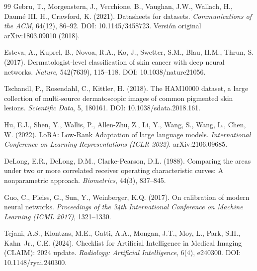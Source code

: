 \begin{thebibliography}{99}
Gebru, T., Morgenstern, J., Vecchione, B., Vaughan, J.W., Wallach, H., Daumé III, H., Crawford, K. (2021). Datasheets for datasets. \emph{Communications of the ACM}, 64(12), 86--92. DOI: 10.1145/3458723. Versión original arXiv:1803.09010 (2018).

Esteva, A., Kuprel, B., Novoa, R.A., Ko, J., Swetter, S.M., Blau, H.M., Thrun, S. (2017). Dermatologist-level classification of skin cancer with deep neural networks. \emph{Nature}, 542(7639), 115--118. DOI: 10.1038/nature21056.

Tschandl, P., Rosendahl, C., Kittler, H. (2018). The HAM10000 dataset, a large collection of multi-source dermatoscopic images of common pigmented skin lesions. \emph{Scientific Data}, 5, 180161. DOI: 10.1038/sdata.2018.161.

Hu, E.J., Shen, Y., Wallis, P., Allen-Zhu, Z., Li, Y., Wang, S., Wang, L., Chen, W. (2022). LoRA: Low-Rank Adaptation of large language models. \emph{International Conference on Learning Representations (ICLR 2022)}. arXiv:2106.09685.

DeLong, E.R., DeLong, D.M., Clarke-Pearson, D.L. (1988). Comparing the areas under two or more correlated receiver operating characteristic curves: A nonparametric approach. \emph{Biometrics}, 44(3), 837--845.

Guo, C., Pleiss, G., Sun, Y., Weinberger, K.Q. (2017). On calibration of modern neural networks. \emph{Proceedings of the 34th International Conference on Machine Learning (ICML 2017)}, 1321--1330.

Tejani, A.S., Klontzas, M.E., Gatti, A.A., Mongan, J.T., Moy, L., Park, S.H., Kahn~Jr., C.E. (2024). Checklist for Artificial Intelligence in Medical Imaging (CLAIM): 2024 update. \emph{Radiology: Artificial Intelligence}, 6(4), e240300. DOI: 10.1148/ryai.240300.

\end{thebibliography}
